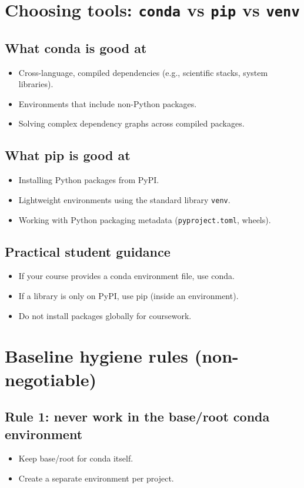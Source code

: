 \section{Choosing tools: \texttt{conda} vs \texttt{pip} vs \texttt{venv}}
\subsection{What conda is good at}
\begin{itemize}
\item Cross-language, compiled dependencies (e.g., scientific stacks, system libraries).
\item Environments that include non-Python packages.
\item Solving complex dependency graphs across compiled packages.
\end{itemize}

\subsection{What pip is good at}
\begin{itemize}
\item Installing Python packages from PyPI.
\item Lightweight environments using the standard library \texttt{venv}.
\item Working with Python packaging metadata (\texttt{pyproject.toml}, wheels).
\end{itemize}

\subsection{Practical student guidance}
\begin{itemize}
\item If your course provides a conda environment file, use conda.
\item If a library is only on PyPI, use pip (inside an environment).
\item Do not install packages globally for coursework.
\end{itemize}

\section{Baseline hygiene rules (non-negotiable)}
\subsection{Rule 1: never work in the base/root conda environment}
\begin{itemize}
\item Keep base/root for conda itself.
\item Create a separate environment per project.
\end{itemize}

